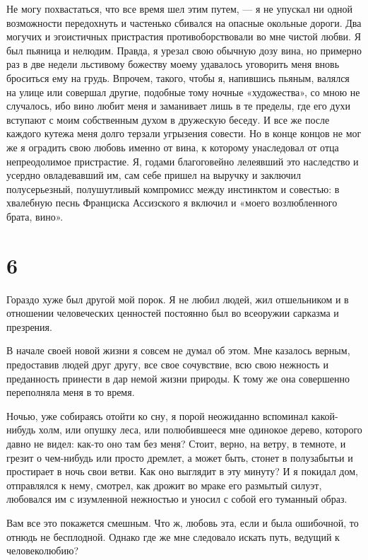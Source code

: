 Не  могу  похвастаться,  что  все  время шел  этим  путем,  ---  я  не
упускал  ни  одной возможности  передохнуть  и  частенько сбивался  на
опасные  окольные  дороги.  Два   могучих  и  эгоистичных  пристрастия
противоборствовали  во мне  чистой  любви. Я  был  пьяница и  нелюдим.
Правда, я урезал свою обычную дозу  вина, но примерно раз в две недели
льстивому божеству моему удавалось  уговорить меня вновь броситься ему
на грудь. Впрочем, такого, чтобы я, напившись пьяным, валялся на улице
или совершал  другие, подобные  тому ночные  «художества», со  мною не
случалось, ибо вино любит меня и заманивает лишь в те пределы, где его
духи вступают  с моим собственным духом  в дружескую беседу. И  все же
после каждого кутежа меня долго  терзали угрызения совести. Но в конце
концов не  мог же я  оградить свою любовь  именно от вина,  к которому
унаследовал от отца непреодолимое  пристрастие. Я, годами благоговейно
лелеявший это  наследство и усердно  овладевавший им, сам  себе пришел
на  выручку и  заключил полусерьезный,  полушутливый компромисс  между
инстинктом  и  совестью:  в  хвалебную песнь  Франциска  Ассизского  я
включил и «моего возлюбленного брата, вино».


\section*{6}


Гораздо хуже был другой мой порок. Я не любил людей, жил отшельником и
в отношении человеческих ценностей постоянно был во всеоружии сарказма
и презрения.

В начале  своей новой жизни  я совсем не  думал об этом.  Мне казалось
верным, предоставив  людей друг другу,  все свое сочувствие,  всю свою
нежность и преданность  принести в дар немой жизни природы.  К тому же
она совершенно переполняла меня в то время.

Ночью,  уже собираясь  отойти  ко сну,  я  порой неожиданно  вспоминал
какой-нибудь  холм, или  опушку  леса, или  полюбившееся мне  одинокое
дерево,  которого давно  не видел:  как-то  оно там  без меня?  Стоит,
верно, на ветру, в темноте, и  грезит о чем-нибудь или просто дремлет,
а может быть, стонет в полузабытьи и простирает в ночь свои ветви. Как
оно  выглядит в  эту  минуту? И  я покидал  дом,  отправлялся к  нему,
смотрел,  как дрожит  во мраке  его  размытый силуэт,  любовался им  с
изумленной нежностью и уносил с собой его туманный образ.

Вам  все  это покажется  смешным.  Что  ж,  любовь  эта, если  и  была
ошибочной, то отнюдь не бесплодной. Однако где же мне следовало искать
путь, ведущий к человеколюбию?

